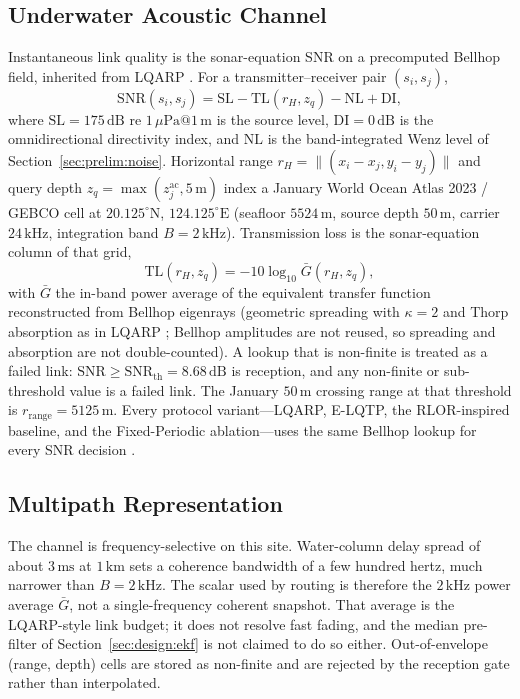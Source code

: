 \subsection{Underwater Acoustic Channel}
\label{sec:prelim:urick}
Instantaneous link quality is the sonar-equation SNR on a
precomputed Bellhop field, inherited from LQARP
\cite{liu2026lqarp}.
For a transmitter--receiver pair $(s_i,s_j)$,
\begin{equation}
\label{eq:snr}
\mathrm{SNR}(s_i,s_j)
= \mathrm{SL}-\mathrm{TL}(r_H,z_q)-\mathrm{NL}+\mathrm{DI},
\end{equation}
where $\mathrm{SL}=175\,\mathrm{dB}$ re $1\,\mu\mathrm{Pa}@1\,\mathrm{m}$
is the source level, $\mathrm{DI}=0\,\mathrm{dB}$ is the
omnidirectional directivity index, and $\mathrm{NL}$ is the
band-integrated Wenz level of Section~\ref{sec:prelim:noise}.
Horizontal range $r_H=\|(x_i-x_j,y_i-y_j)\|$ and query depth
$z_q=\max(z_j^{\mathrm{ac}},5\,\mathrm{m})$ index a January
World Ocean Atlas 2023 / GEBCO cell at
$20.125^\circ\mathrm{N}$, $124.125^\circ\mathrm{E}$
(seafloor $5524\,\mathrm{m}$, source depth $50\,\mathrm{m}$,
carrier $24\,\mathrm{kHz}$, integration band $B=2\,\mathrm{kHz}$).
Transmission loss is the sonar-equation column of that grid,
\begin{equation}
\label{eq:tl}
\mathrm{TL}(r_H,z_q)=-10\log_{10}\bar{G}(r_H,z_q),
\end{equation}
with $\bar{G}$ the in-band power average of the equivalent transfer
function reconstructed from Bellhop eigenrays (geometric spreading
with $\kappa=2$ and Thorp absorption as in LQARP
\cite{liu2026lqarp}; Bellhop amplitudes are not reused, so spreading
and absorption are not double-counted).
A lookup that is non-finite is treated as a failed link:
$\mathrm{SNR}\ge\mathrm{SNR}_{\mathrm{th}}=8.68\,\mathrm{dB}$ is
reception, and any non-finite or sub-threshold value is a failed link.
The January $50\,\mathrm{m}$ crossing range at that threshold is
$r_{\mathrm{range}}=5125\,\mathrm{m}$.
Every protocol variant---LQARP, E-LQTP, the RLOR-inspired baseline,
and the Fixed-Periodic ablation---uses the same Bellhop lookup for
every SNR decision \cite{liu2026lqarp}.

\subsection{Multipath Representation}
\label{sec:prelim:mp}
The channel is frequency-selective on this site.
Water-column delay spread of about $3\,\mathrm{ms}$ at $1\,\mathrm{km}$
sets a coherence bandwidth of a few hundred hertz, much narrower
than $B=2\,\mathrm{kHz}$.
The scalar used by routing is therefore the $2\,\mathrm{kHz}$
power average $\bar{G}$, not a single-frequency coherent snapshot.
That average is the LQARP-style link budget; it does not resolve
fast fading, and the median pre-filter of
Section~\ref{sec:design:ekf} is not claimed to do so either.
Out-of-envelope (range, depth) cells are stored as non-finite and
are rejected by the reception gate rather than interpolated.

